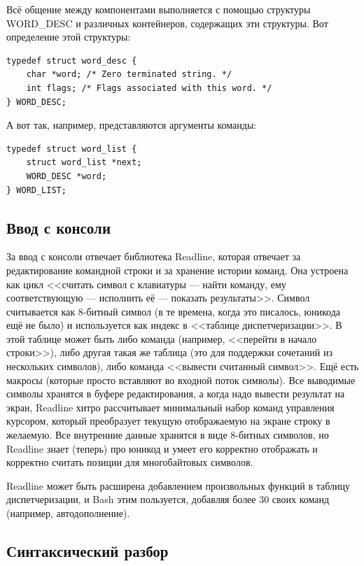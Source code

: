 \documentclass[a5paper]{article}
\begin{document}
Всё общение между компонентами выполняется с помощью структуры WORD\_DESC и различных контейнеров, содержащих эти структуры. Вот определение этой структуры:

\begin{verbatim}
typedef struct word_desc {
    char *word; /* Zero terminated string. */
    int flags; /* Flags associated with this word. */
} WORD_DESC;
\end{verbatim}

А вот так, например, представляются аргументы команды:

\begin{verbatim}
typedef struct word_list {
    struct word_list *next;
    WORD_DESC *word;
} WORD_LIST;
\end{verbatim}

\subsection{Ввод с консоли}

За ввод с консоли отвечает библиотека Readline, которая отвечает за редактирование командной строки и за хранение истории команд. Она устроена как цикл <<считать символ с клавиатуры --- найти команду, ему соответствующую --- исполнить её --- показать результаты>>. Символ считывается как 8-битный символ (в те времена, когда это писалось, юникода ещё не было) и используется как индекс в <<таблице диспетчеризации>>. В этой таблице может быть либо команда (например, <<перейти в начало строки>>), либо другая такая же таблица (это для поддержки сочетаний из нескольких символов), либо команда <<вывести считанный символ>>. Ещё есть макросы (которые просто вставляют во входной поток символы). Все выводимые символы хранятся в буфере редактирования, а когда надо вывести результат на экран, Readline хитро рассчитывает минимальный набор команд управления курсором, который преобразует текущую отображаемую на экране строку в желаемую. Все внутренние данные хранятся в виде 8-битных символов, но Readline знает (теперь) про юникод и умеет его корректно отображать и корректно считать позиции для многобайтовых символов.

Readline может быть расширена добавлением произвольных функций в таблицу диспетчеризации, и Bash этим пользуется, добавляя более 30 своих команд (например, автодополнение).

\subsection{Синтаксический разбор}
\end{document}
